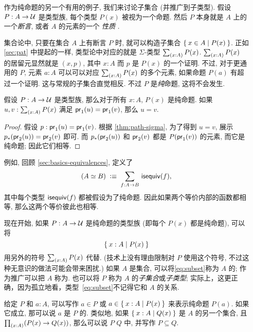 %

作为纯命题的另一个有用的例子, 我们来讨论子集合 (并推广到子类型).
假设 $P:A\to\mathcal{U}$ 是类型族, 每个类型 $P(x)$ 被视为一个命题.
然后 $P$ 本身就是 $A$ 上的一个\emph{断言}, 或者 $A$ 的元素的一个 \emph{性质} .

集合论中, 只要在集合 $A$ 上有断言 $P$ 时, 就可以构造子集合 $\Set{x\in A | P(x)}$.
正如 \cref{sec:pat} 中提起的一样, 类型论中对应的就是 $\Sigma$-类型 $\sm{x:A} P(x)$.
$\sm{x:A} P(x)$ 的居留元显然就是 $(x,p)$, 其中 $x:A$ 而 $p$ 是 $P(x)$ 的一个证明.
不过, 对于更通用的 $P$, 元素 $a:A$ 可以可以对应 $\sm{x:A} P(x)$ 的多个元素, 如果命题 $P(a)$ 有超过一个证明.
这与常规的子集合直觉相反.
不过 $P$ 是\emph{纯}命题, 这将不会发生.

\begin{lem}
    \label{thm:path-subset}
    假设 $P:A\to\mathcal{U}$ 是类型族, 那么对于所有 $x:A$, $P(x)$ 是纯命题.
    如果 $u,v:\sm{x:A} P(x)$ 满足 $\mathsf{pr}_{1}(u) = \mathsf{pr}_{1}(v)$, 那么 $u=v$.
\end{lem}
\begin{proof}
    假设 $p:\mathsf{pr}_{1}(u) = \mathsf{pr}_{1}(v)$.
    根据 \cref{thm:path-sigma}, 为了得到 $u=v$, 展示 ${p}_{*}\mathopen{}\left({\mathsf{pr}_{2}(u)}\right)\mathclose{} = \mathsf{pr}_{2}(v)$ 即可.
    而 ${p}_{*}\mathopen{}\left({\mathsf{pr}_{2}(u)}\right)\mathclose{}$ 和 $\mathsf{pr}_{2}(v)$ 都是 $P(\mathsf{pr}_{1}(v))$ 的元素, 而它是纯命题; 因此它们相等.
\end{proof}

例如, 回顾 \cref{sec:basics-equivalences}, 定义了
\[(\eqv A B) \;\defeq\; \sm{f:A\to B} \isequiv (f),\]
其中每个类型 $\mathsf{isequiv} (f)$ 都被假设为了纯命题.
因此如果两个等价内部的函数都相等, 那么这两个等价彼此也相等.

\label{defn:setof}%
现在开始, 如果 $P:A\to \mathcal{U}$ 是纯命题的类型族 (即每个 $P(x)$ 都是纯命题), 可以将
%
\begin{equation}
    \label{eq:subset}
    \setof{x:A | P(x)}
\end{equation}
%
用另外的符号 $\sm{x:A} P(x)$ 代替.
(技术上没有理由限制对 $P$ 使用这个符号, 不过这种无意识的做法可能会带来困扰.)
如果 $A$ 是集合, 可以将\eqref{eq:subset}称为 $A$ 的;
%
%
作为推广可以把 $A$ 称为.
%
也可以将 $P$ 称为 $A$ 的\emph{子集合}或\emph{子类型};
实际上，这更正确，因为孤立地看，类型~\eqref{eq:subset}不记得它和 $A$ 的关系.

给定 $P$ 和 $a:A$, 可以写作 $a\in P$ 或 $a\in \Set{x:A | P(x)}$ 来表示纯命题 $P(a)$.
如果它成立, 那可以说 $a$ 是 $P$ 的.
类似地, 如果 $\Set{x:A | Q(x)}$ 是 $A$ 的另一个集合, 且 $\prd{x:A}(P(x)\rightarrow Q(x))$, 那么可以说 $P$ %
%
$Q$ 中, 并写作 $P\subseteq Q$.

